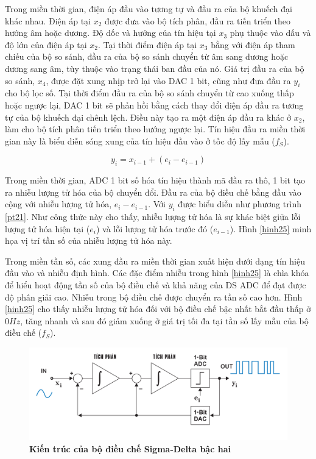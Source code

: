 Trong miền thời gian, điện áp đầu vào tương tự và đầu ra của bộ khuếch đại khác nhau. Điện áp tại $x_2$ được đưa vào bộ tích phân, đầu ra tiến triển theo hướng âm hoặc dương. Độ dốc và hướng của tín hiệu tại $x_3$ phụ thuộc vào dấu và độ lớn của điện áp tại $x_2$. Tại thời điểm điện áp tại $x_3$ bằng với điện áp tham chiếu của bộ so sánh, đầu ra của bộ so sánh chuyển từ âm sang dương hoặc dương sang âm, tùy thuộc vào trạng thái ban đầu của nó. Giá trị đầu ra của bộ so sánh, $x_4$, được đặt xung nhịp trở lại vào DAC 1 bit, cũng như đưa đầu ra $y_i$ cho bộ lọc số. Tại thời điểm đầu ra của bộ so sánh chuyển từ cao xuống thấp hoặc ngược lại, DAC 1 bit sẽ phản hồi bằng cách thay đổi điện áp đầu ra tương tự của bộ khuếch đại chênh lệch. Điều này tạo ra một điện áp đầu ra khác ở $x_2$, làm cho bộ tích phân tiến triển theo hướng ngược lại. Tín hiệu đầu ra miền thời gian này là biểu diễn sóng xung của tín hiệu đầu vào ở tốc độ lấy mẫu ($f_S$).

\begin{equation}\label{pt21}
    y_i = x_{i - 1} + (e_i - e_{i - 1})
\end{equation}

 Trong miền thời gian, ADC 1 bit số hóa tín hiệu thành mã đầu ra thô, 1 bit tạo ra nhiễu lượng tử hóa của bộ chuyển đổi. Đầu ra của bộ điều chế bằng đầu vào cộng với nhiễu lượng tử hóa, $e_i - e_{i-1}$. Với $y_i$ được biểu diễn như phương trình \ref{pt21}. Như công thức này cho thấy, nhiễu lượng tử hóa là sự khác biệt giữa lỗi lượng tử hóa hiện tại ($e_i$) và lỗi lượng tử hóa trước đó ($e_{i - 1}$). Hình \ref{hinh25} minh họa vị trí tần số của nhiễu lượng tử hóa này.

Trong miền tần số, các xung đầu ra miền thời gian xuất hiện dưới dạng tín hiệu đầu vào và nhiễu định hình. Các đặc điểm nhiễu trong hình \ref{hinh25} là chìa khóa để hiểu hoạt động tần số của bộ điều chế và khả năng của DS ADC để đạt được độ phân giải cao. Nhiễu trong bộ điều chế được chuyển ra tần số cao hơn. Hình \ref{hinh25} cho thấy nhiễu lượng tử hóa đối với bộ điều chế bậc nhất bắt đầu thấp ở $0 Hz$, tăng nhanh và sau đó giảm xuống ở giá trị tối đa tại tần số lấy mẫu của bộ điều chế ($f_S$).

\begin{figure}[!ht]
    \centering
    \includegraphics[width=13cm]{Images/Chuong2/kientruc_2st.png}
    \caption[Kiến trúc của bộ điều chế Sigma-Delta bậc hai]{\bfseries \fontsize{12pt}{0pt}\selectfont Kiến trúc của bộ điều chế Sigma-Delta bậc hai}
    \label{hinh26}
\end{figure}

